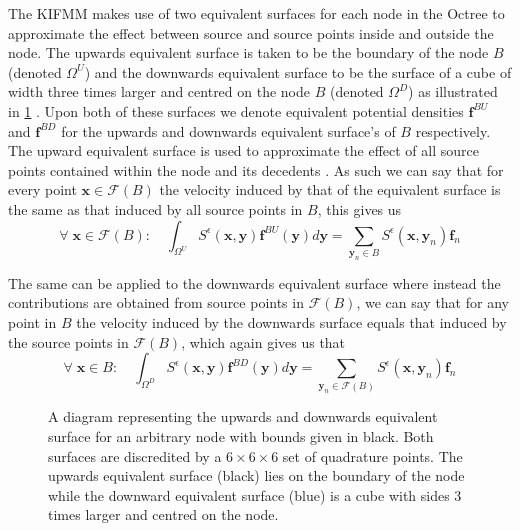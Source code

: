 The KIFMM makes use of two equivalent surfaces for each node in the Octree to approximate the effect between source and source points inside and outside the node. The upwards equivalent surface is taken to be the boundary of the node $B$ (denoted $\Omega^U$) and the downwards equivalent surface to be the surface of a cube of width three times larger and centred on the node $B$ (denoted $\Omega^D$) as illustrated in \cref{fig:UpandDownsurf} \cite{Ying2004}. Upon both of these surfaces we denote equivalent potential densities $\bm{f}^{BU}$ and $\bm{f}^{BD}$ for the upwards and downwards equivalent surface's of $B$ respectively. The upward equivalent surface is used to approximate the effect of all source points contained within the node and its decedents \cite{Rostami2016Kernel-independentStokeslets,Yan}. As such we can say that for every point $\bm{x}\in\mathcal{F}(B)$ the velocity induced by that of the equivalent surface is the same as that induced by all source points in $B$, this gives us
\begin{equation}
\label{eq:upsurfint}
    \forall \;\bm{x} \in \mathcal{F}(B): \quad \int_{\Omega^U} S^\epsilon(\bm{x}, \bm{y}) \bm{f}^{BU}(\bm{y}) d \bm{y}=\sum_{{\bm{y}}_n \in B} S^\epsilon\left(\bm{x}, {\bm{y}}_n\right) {\bm{f}}_{n}
\end{equation}

The same can be applied to the downwards equivalent surface where instead the contributions are obtained from source points in $\mathcal{F}(B)$, we can say that for any point in $B$ the velocity induced by the downwards surface equals that induced by the source points in $\mathcal{F}(B)$, which again gives us that
\begin{equation}
\label{eq:downsurfint}
    \forall \;\bm{x} \in B: \quad \int_{\Omega^D} S^\epsilon(\bm{x}, \bm{y}) \bm{f}^{BD}(\bm{y}) d \bm{y}=\sum_{{\bm{y}}_n \in \mathcal{F}(B)} S^\epsilon\left(\bm{x}, {\bm{y}}_n\right) {\bm{f}}_{n}
\end{equation}

\begin{figure}[ht]
    \centering
    \resizebox{.6\linewidth}{!}{}
    \caption{A diagram representing the upwards and downwards equivalent surface for an arbitrary node with bounds given in black. Both surfaces are discredited by a $6 \times 6 \times 6$ set of quadrature points. The upwards equivalent surface (black) lies on the boundary of the node while the downward equivalent surface (blue) is a cube with sides 3 times larger and centred on the node. }
    \label{fig:UpandDownsurf}
\end{figure}

